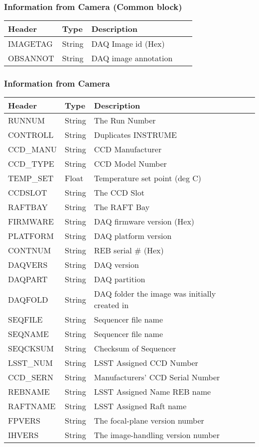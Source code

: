 \subsubsection{Information from Camera (Common block)}


\begin{tabular}{l l l l l}
\hline
Header & Type & Description \\
\hline
IMAGETAG & String & DAQ Image id (Hex) \\
OBSANNOT & String & DAQ image annotation \\
\hline
\end{tabular}


\subsubsection{Information from Camera}


\begin{tabular}{l l l l l}
\hline
Header & Type & Description \\
\hline
RUNNUM & String & The Run Number \\
CONTROLL & String & Duplicates INSTRUME \\
CCD\_MANU & String & CCD Manufacturer \\
CCD\_TYPE & String & CCD Model Number \\
TEMP\_SET & Float & Temperature set point (deg C) \\
CCDSLOT & String & The CCD Slot \\
RAFTBAY & String & The RAFT Bay \\
FIRMWARE & String & DAQ firmware version (Hex) \\
PLATFORM & String & DAQ platform version \\
CONTNUM & String & REB serial \# (Hex) \\
DAQVERS & String & DAQ version \\
DAQPART & String & DAQ partition \\
DAQFOLD & String & DAQ folder the image was initially created in \\
SEQFILE & String & Sequencer file name \\
SEQNAME & String & Sequencer file name \\
SEQCKSUM & String & Checksum of Sequencer \\
LSST\_NUM & String & LSST Assigned CCD Number \\
CCD\_SERN & String & Manufacturers’ CCD Serial Number \\
REBNAME & String & LSST Assigned Name REB name \\
RAFTNAME & String & LSST Assigned Raft name \\
FPVERS & String & The focal-plane version number \\
IHVERS & String & The image-handling version number \\
\hline
\end{tabular}


